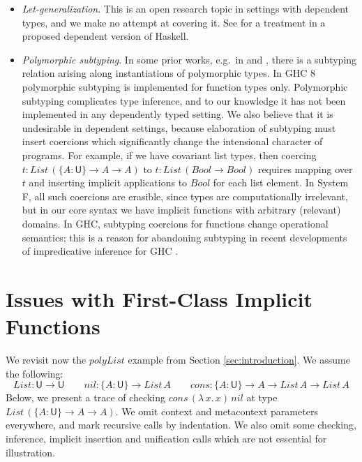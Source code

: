 \documentclass[acmsmall,screen,dvipsnames]{acmart}\settopmatter{}
\renewcommand{\U}{\mathsf{U}}
\newcommand{\mi}[1]{\mathit{#1}}
\theoremstyle{remark}
\begin{document}
\begin{itemize}
  \item \emph{Let-generalization}. This is an open research topic in settings
    with dependent types, and we make no attempt at covering it. See
    \cite{eisenberg2016dependent} for a treatment in a proposed dependent
    version of Haskell.
  \item \emph{Polymorphic subtyping}. In some prior works, e.g.\ in
    \cite{dunfield2013complete} and \cite{vytiniotis2008fph}, there is a
    subtyping relation arising along instantiations of polymorphic types. In GHC
    8 polymorphic subtyping is implemented for function types only. Polymorphic
    subtyping complicates type inference, and to our knowledge it has not been
    implemented in any dependently typed setting. We also believe that it is
    undesirable in dependent settings, because elaboration of subtyping must
    insert coercions which significantly change the intensional character of
    programs. For example, if we have covariant list types, then coercing $t :
    \mi{List}\,(\{A : \U\}\to A \to A)$ to $t : \mi{List}\,(\mi{Bool} \to
    \mi{Bool})$ requires mapping over $t$ and inserting implicit applications to
    $\mi{Bool}$ for each list element. In System F, all such coercions are
    erasible, since types are computationally irrelevant, but in our core syntax
    we have implicit functions with arbitrary (relevant) domains. In GHC,
    subtyping coercions for functions change operational semantics; this is a
    reason for abandoning subtyping in recent developments of impredicative
    inference for GHC
    \cite{serrano2020a}.
\end{itemize}

\section{Issues with First-Class Implicit Functions}
\label{sec:issues}

We revisit now the $polyList$ example from Section \ref{sec:introduction}. We
assume the following:
\[
List : \U \to \U \qquad nil : \{A : \U\} \to List\,A \qquad
cons : \{A : \U\} \to A \to List\,A \to List\,A
\]
Below, we present a trace of checking $cons\,(\lambda\,x.\,x)\,nil$
at type $List\,(\{A : \U\}\to A \to A)$. We omit context and metacontext
parameters everywhere, and mark recursive calls by indentation. We also omit
some checking, inference, implicit insertion and unification calls which are not
essential for illustration.
\end{document}
